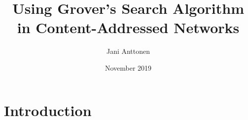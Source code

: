 \documentclass{article}
\title{Using Grover's Search Algorithm in Content-Addressed Networks}
\author{Jani Anttonen}
\date{November 2019}
\begin{document}
\maketitle

\section{Introduction}

%
%
%
%
%
\end{document}

